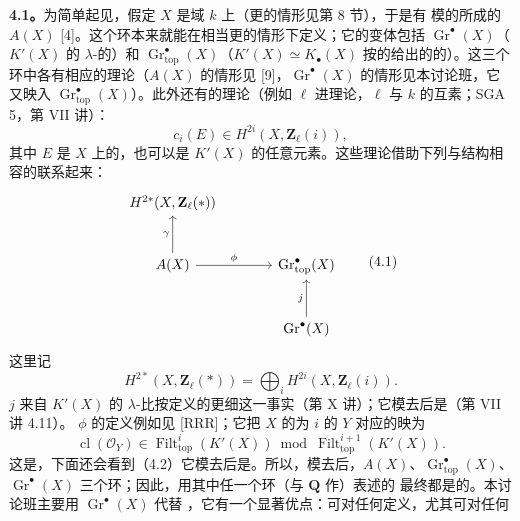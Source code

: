 \textbf{4.1。}为简单起见，假定 $X$ 是域 $k$ 上（更的情形见第 8 节），于是有
模的所成的  $A(X)$ [4]。这个环本来就能在相当更的情形下定义；它的变体包括 $\operatorname{Gr}^\bullet(X)$（$K'(X)$ 的 $\lambda$-的）和 $\operatorname{Gr}_{\mathrm{top}}^\bullet(X)$（$K'(X)\simeq K_\bullet(X)$ 按的给出的的）。这三个环中各有相应的理论（$A(X)$ 的情形见 [9]，$\operatorname{Gr}^\bullet(X)$ 的情形见本讨论班，它又映入 $\operatorname{Gr}_{\mathrm{top}}^\bullet(X)$）。此外还有的理论（例如 $\ell$ 进理论，$\ell$ 与 $k$ 的互素；SGA 5，第 VII 讲）：
\[c_i(E)\in H^{2i}(X,\mathbf Z_\ell(i)),\]
其中 $E$ 是 $X$ 上的，也可以是 $K'(X)$ 的任意元素。这些理论借助下列与结构相容的联系起来：
\[\begin{tikzcd}[column sep=large,row sep=large]
H^{2*}(X,\mathbf Z_\ell(*)) & {}\\
A(X)\arrow[u,"\gamma"]\arrow[r,"\phi"] &
\operatorname{Gr}_{\mathrm{top}}^\bullet(X)\\
{} & \operatorname{Gr}^\bullet(X)\arrow[u,"j"]
\end{tikzcd}\tag{4.1}\]
这里记
\[H^{2*}(X,\mathbf Z_\ell(*))
=\bigoplus_iH^{2i}(X,\mathbf Z_\ell(i)).\]
 $j$ 来自 $K'(X)$ 的 $\lambda$-比按定义的更细这一事实（第 X 讲）；它模去后是（第 VII 讲 4.11）。 $\phi$ 的定义例如见 [RRR]；它把 $X$ 的为 $i$ 的 $Y$ 对应的映为
\[\operatorname{cl}(\mathscr O_Y)\in
\operatorname{Filt}_{\mathrm{top}}^i(K'(X))
\bmod\operatorname{Filt}_{\mathrm{top}}^{i+1}(K'(X)).\]
这是，下面还会看到（4.2）它模去后是。所以，模去后，$A(X)$、$\operatorname{Gr}_{\mathrm{top}}^\bullet(X)$、$\operatorname{Gr}^\bullet(X)$ 三个环；因此，用其中任一个环（与 $\mathbf Q$ 作）表述的 最终都是的。本讨论班主要用 $\operatorname{Gr}^\bullet(X)$ 代替 ，它有一个显著优点：可对任何定义，尤其可对任何
